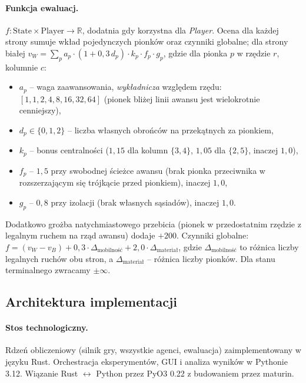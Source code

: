 \paragraph{Funkcja ewaluacj.}
$f: \text{State} \times \text{Player} \to \mathbb{R}$, dodatnia gdy korzystna
dla \emph{Player}. Ocena dla każdej strony sumuje wkład pojedynczych pionków
oraz czynniki globalne; dla strony białej $v_W = \sum_p a_p \cdot (1 + 0{,}3\,d_p)
\cdot k_p \cdot f_p \cdot g_p$, gdzie dla pionka $p$ w rzędzie $r$, kolumnie $c$:
\begin{itemize}[nosep]
    \item $a_p$ -- waga zaawansowania, \emph{wykładnicza} względem rzędu:
          $[1, 1, 2, 4, 8, 16, 32, 64]$ (pionek bliżej linii awansu jest
          wielokrotnie cenniejszy),
    \item $d_p \in \{0,1,2\}$ -- liczba własnych obrońców na przekątnych za pionkiem,
    \item $k_p$ -- bonus centralności ($1{,}15$ dla kolumn $\{3,4\}$, $1{,}05$ dla $\{2,5\}$, inaczej $1{,}0$),
    \item $f_p$ -- $1{,}5$ przy swobodnej ścieżce awansu (brak pionka przeciwnika
          w rozszerzającym się trójkącie przed pionkiem), inaczej $1{,}0$,
    \item $g_p$ -- $0{,}8$ przy izolacji (brak własnych sąsiadów), inaczej $1{,}0$.
\end{itemize}
Dodatkowo grożba natychmiastowego przebicia (pionek w przedostatnim rzędzie
z legalnym ruchem na rząd awansu) dodaje $+200$. Czynniki globalne:
$f = (v_W - v_B) + 0{,}3 \cdot \Delta_{\text{mobilność}} + 2{,}0 \cdot \Delta_{\text{materiał}}$,
gdzie $\Delta_{\text{mobilność}}$ to różnica liczby legalnych ruchów obu stron,
a $\Delta_{\text{materiał}}$ -- różnica liczby pionków. Dla stanu terminalnego
zwracamy $\pm\infty$.

\subsection{Architektura implementacji}

\paragraph{Stos technologiczny.}
Rdzeń obliczeniowy (silnik gry, wszystkie agenci, ewaluacja) zaimplementowany
w języku Rust. Orchestracja eksperymentów, GUI i analiza wyników w Pythonie 3.12.
Wiązanie Rust $\leftrightarrow$ Python przez PyO3 0.22 z budowaniem przez maturin.


